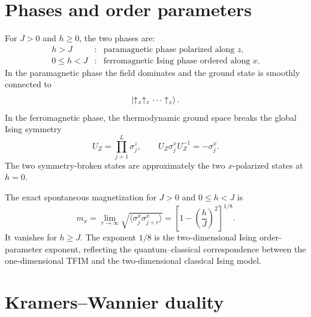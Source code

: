 \section{Phases and order parameters}
\label{sec:tfim-phases-order-parameters}

For $J>0$ and $h\geq0$, the two phases are:
\begin{equation}
\label{eq:tfim-phase-summary}
\begin{array}{ccl}
    h>J &:& \text{paramagnetic phase polarized along } z,\\[2pt]
    0\leq h<J &:& \text{ferromagnetic Ising phase ordered along } x.
\end{array}
\end{equation}
In the paramagnetic phase the field dominates and the ground state is smoothly
connected to
\begin{equation}
    \left|\uparrow_z\uparrow_z\cdots\uparrow_z\right\rangle.
\end{equation}
In the ferromagnetic phase, the thermodynamic ground space breaks the global
Ising symmetry
\begin{equation}
\label{eq:tfim-z2-symmetry}
    U_Z=\prod_{j=1}^{L}\sigma_j^z,
    \qquad
    U_Z\sigma_j^xU_Z^{-1}=-\sigma_j^x.
\end{equation}
The two symmetry-broken states are approximately the two $x$-polarized states at
$h=0$.

The exact spontaneous magnetization for $J>0$ and $0\leq h<J$ is
\begin{equation}
\label{eq:tfim-exact-order-parameter}
    m_x
    =
    \lim_{r\to\infty}
    \sqrt{\langle \sigma_j^x\sigma_{j+r}^x\rangle}
    =
    \left[1-\left(\frac{h}{J}\right)^2\right]^{1/8}.
\end{equation}
It vanishes for $h\geq J$.  The exponent $1/8$ is the two-dimensional Ising order-parameter exponent, reflecting the quantum--classical correspondence between the
one-dimensional TFIM and the two-dimensional classical Ising model.

\section{Kramers--Wannier duality}
\label{sec:tfim-kramers-wannier-duality}

